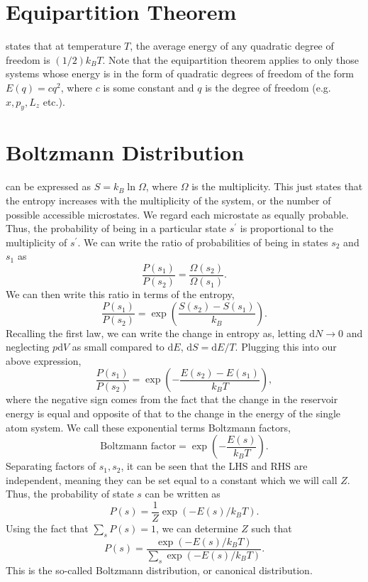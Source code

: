 \section{Equipartition Theorem}
 states that at temperature $T$, the average energy of any quadratic degree of freedom is $(1/2)k_BT$. Note that the equipartition theorem applies to only those systems whose energy is in the form of quadratic degrees of freedom of the form $E(q) = cq^2$, where $c$ is some constant and $q$ is the degree of freedom (e.g. $x,p_y,L_z$ etc.).

\section{Boltzmann Distribution}
 can be expressed as $S=k_B\ln{\Omega}$, where $\Omega$ is the multiplicity. This just states that the entropy increases with the multiplicity of the system, or the number of possible accessible microstates. We regard each microstate as equally probable. Thus, the probability of being in a particular state $s^{'}$ is proportional to the multiplicity of $s^{'}$. We can write the ratio of probabilities of being in states $s_2$ and $s_1$ as
\begin{equation}
	\frac{P(s_1)}{P(s_2)} = \frac{\Omega(s_2)}{\Omega(s_1)}.
\end{equation}
We can then write this ratio in terms of the entropy,
\begin{equation}
	\frac{P(s_1)}{P(s_2)} = \exp{\left(\frac{S(s_2) - S(s_1)}{k_B}\right)}.
\end{equation}
Recalling the first law, we can write the change in entropy as, letting $\mathrm{d}N\to0$ and neglecting $p\mathrm{d}V$ as small compared to $\mathrm{d}E$, $\mathrm{d}S=\mathrm{d}E/T$. Plugging this into our above expression,
\begin{equation}
	\frac{P(s_1)}{P(s_2)} = \exp{\left(-\frac{E(s_2) - E(s_1)}{k_BT}\right)},
\end{equation}
where the negative sign comes from the fact that the change in the reservoir energy is equal and opposite of that to the change in the energy of the single atom system. We call these exponential terms Boltzmann factors,
\begin{equation}
	\text{Boltzmann factor} = \exp{\left(-\frac{E(s)}{k_BT}\right)}.
\end{equation}
Separating factors of $s_1,s_2$, it can be seen that the LHS and RHS are independent, meaning they can be set equal to a constant which we will call $Z$. Thus, the probability of state $s$ can be written as 
\begin{equation}
	P(s) = \frac{1}{Z}\exp{(-E(s)/k_BT)}.
\end{equation}
Using the fact that $\sum_sP(s)=1$, we can determine $Z$ such that
\begin{equation}
	P(s) = \frac{\exp{(-E(s)/k_BT)}}{\sum_s\exp{(-E(s)/k_BT)}}.
\end{equation}
This is the so-called Boltzmann distribution, or canonical distribution.

